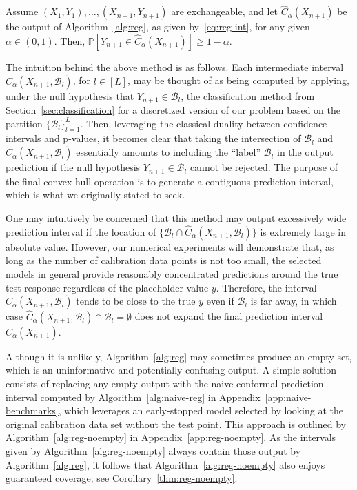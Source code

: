 \begin{theorem}\label{thm:reg}
Assume $(X_{1},Y_{1}), \ldots, (X_{n+1},Y_{n+1})$ are exchangeable, and let $\hat{C}_{\alpha}(X_{n+1})$ be the output of Algorithm~\ref{alg:reg}, as given by~\eqref{eq:reg-int}, for any given $\alpha \in (0,1)$.
Then, $\mathbb{P}[Y_{n+1} \in \hat{C}_{\alpha}(X_{n+1})] \geq 1-\alpha$.
\end{theorem}

The intuition behind the above method is as follows.
Each intermediate interval $\hat{C}_{\alpha}(X_{n+1}, \mathcal{B}_l)$, for $l \in [L]$, may be thought of as being computed by applying, under the null hypothesis that $Y_{n+1} \in \mathcal{B}_l$, the classification method from Section~\ref{sec:classification} for a discretized version of our problem based on the partition $\{\mathcal{B}_l\}_{l=1}^{L}$. Then, leveraging the classical duality between confidence intervals and p-values, it becomes clear that taking the intersection of $\mathcal{B}_l$ and $\hat{C}_{\alpha}(X_{n+1}, \mathcal{B}_l)$ essentially amounts to including the ``label'' $\mathcal{B}_l$ in the output prediction if the null hypothesis $Y_{n+1} \in \mathcal{B}_l$ cannot be rejected.
The purpose of the final convex hull operation is to generate a contiguous prediction interval, which is what we originally stated to seek.

One may intuitively be concerned that this method may output excessively wide prediction interval if the location of $\{\mathcal{B}_l \cap \hat{C}_\alpha(X_{n+1}, \mathcal{B}_l)\}$ is extremely large in absolute value.
However, our numerical experiments will demonstrate that, as long as the number of calibration data points is not too small, the selected models in general provide reasonably concentrated predictions around the true test response regardless of the placeholder value $y$. Therefore, the interval $\hat{C}_\alpha(X_{n+1}, \mathcal{B}_l)$ tends to be close to the true $y$ even if $\mathcal{B}_l$ is far away, in which case $\hat{C}_\alpha(X_{n+1}, \mathcal{B}_l) \cap \mathcal{B}_l = \emptyset$ does not expand the final prediction interval $\hat{C}_\alpha(X_{n+1})$.


Although it is unlikely, Algorithm~\ref{alg:reg} may sometimes produce an empty set, which is an uninformative and potentially confusing output. A simple solution consists of replacing any empty output with the naive conformal prediction interval computed by Algorithm~\ref{alg:naive-reg} in Appendix~\ref{app:naive-benchmarks}, which leverages an early-stopped model selected by looking at the original calibration data set without the test point.
This approach is outlined by Algorithm~\ref{alg:reg-noempty} in Appendix~\ref{app:reg-noempty}.
As the intervals given by Algorithm~\ref{alg:reg-noempty} always contain those output by Algorithm~\ref{alg:reg}, it follows that Algorithm~\ref{alg:reg-noempty} also enjoys guaranteed coverage; see Corollary~\ref{thm:reg-noempty}.


